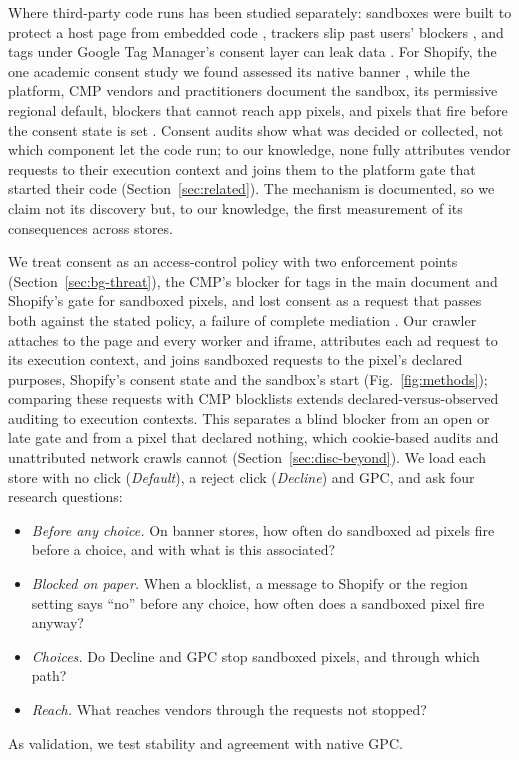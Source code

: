 Where third-party code runs has been studied separately: sandboxes were built to protect a host page from embedded code \citep{terlouw2010adjail,ingram2012treehouse}, trackers slip past users' blockers \citep{bashir2018websockets,dimova2021cname,chen2021filterlist,bottger2026fpt}, and tags under Google Tag Manager's consent layer can leak data \citep{mertens2025gtm}. For Shopify, the one academic consent study we found assessed its native banner \citep{nouwens2025crosscountry}, while the platform, CMP vendors and practitioners document the sandbox, its permissive regional default, blockers that cannot reach app pixels, and pixels that fire before the consent state is set \citep{shopify_aboutpixels,shopify_customerprivacy,truevault_apppixel,onetrust_ecommerce,pandectes_blocking,analyticsninja2025pixels,weltpixel2026race}. Consent audits show what was decided or collected, not which component let the code run; to our knowledge, none fully attributes vendor requests to their execution context and joins them to the platform gate that started their code (Section~\ref{sec:related}). The mechanism is documented, so we claim not its discovery but, to our knowledge, the first measurement of its consequences across stores.

We treat consent as an access-control policy with two enforcement points (Section~\ref{sec:bg-threat}), the CMP's blocker for tags in the main document and Shopify's gate for sandboxed pixels, and lost consent as a request that passes both against the stated policy, a failure of complete mediation \citep{saltzer1975protection}. Our crawler attaches to the page and every worker and iframe, attributes each ad request to its execution context, and joins sandboxed requests to the pixel's declared purposes, Shopify's consent state and the sandbox's start (Fig.~\ref{fig:methods}); comparing these requests with CMP blocklists extends declared-versus-observed auditing \citep{matte2020banners,bollinger2022automating} to execution contexts. This separates a blind blocker from an open or late gate and from a pixel that declared nothing, which cookie-based audits and unattributed network crawls cannot (Section~\ref{sec:disc-beyond}). We load each store with no click (\emph{Default}), a reject click (\emph{Decline}) and GPC, and ask four research questions:
\begin{itemize}
  \item[\RQ{1}] \emph{Before any choice.} On banner stores, how often do sandboxed ad pixels fire before a choice, and with what is this associated?
  \item[\RQ{2}] \emph{Blocked on paper.} When a blocklist, a message to Shopify or the region setting says ``no'' before any choice, how often does a sandboxed pixel fire anyway?
  \item[\RQ{3}] \emph{Choices.} Do Decline and GPC stop sandboxed pixels, and through which path?
  \item[\RQ{4}] \emph{Reach.} What reaches vendors through the requests not stopped?
\end{itemize}
As validation, we test stability and agreement with native GPC.


